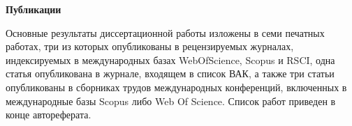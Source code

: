 
\textbf{Публикации}

Основные результаты диссертационной работы изложены в семи печатных работах, три из которых опубликованы в рецензируемых журналах, индексируемых в международных базах WebOfScience, Scopus и RSCI, одна статья опубликована в журнале, входящем в список ВАК, а также три статьи опубликованы в сборниках трудов международных конференций, включенных в международные базы Scopus либо Web Of Science. Список работ приведен в конце автореферата.